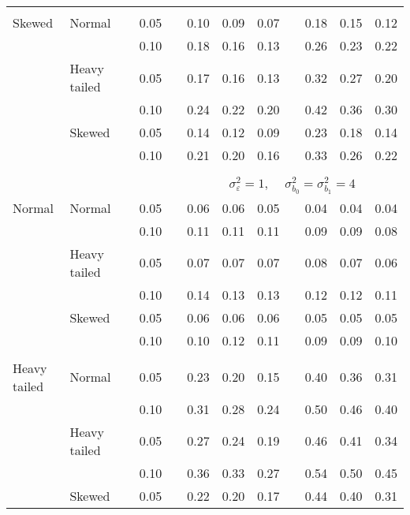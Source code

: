 \begin{table}[ht]
\begin{scriptsize}
\begin{center}
\begin{tabular}{ll p{.1cm} c p{.1cm} rrr p{.1cm} rrr}
             &&&&&&&&&&&\\
Skewed       & Normal       && 0.05 &&  0.10 & 0.09 & 0.07 && 0.18 & 0.15 & 0.12 \\ 
             &              && 0.10 &&  0.18 & 0.16 & 0.13 && 0.26 & 0.23 & 0.22 \\ 
             & Heavy tailed && 0.05 &&  0.17 & 0.16 & 0.13 && 0.32 & 0.27 & 0.20 \\ 
             &              && 0.10 &&  0.24 & 0.22 & 0.20 && 0.42 & 0.36 & 0.30 \\ 
             & Skewed       && 0.05 &&  0.14 & 0.12 & 0.09 && 0.23 & 0.18 & 0.14 \\ 
             &              && 0.10 &&  0.21 & 0.20 & 0.16 && 0.33 & 0.26 & 0.22 \\ 


&&&&&&&&&&&\\
& && && \multicolumn{7}{c}{$\sigma_{\varepsilon}^2 = 1$, \ \ $\sigma_{b_0}^2 = \sigma_{b_1}^2 = 4$} \\ \cline{6-12}
\rowcolor{gray!20}Normal       & Normal       && 0.05 &&  0.06 & 0.06 & 0.05 && 0.04 & 0.04 & 0.04 \\ 
\rowcolor{gray!20}             &              && 0.10 &&  0.11 & 0.11 & 0.11 && 0.09 & 0.09 & 0.08 \\ 
\rowcolor{gray!20}             & Heavy tailed && 0.05 &&  0.07 & 0.07 & 0.07 && 0.08 & 0.07 & 0.06 \\ 
\rowcolor{gray!20}             &              && 0.10 &&  0.14 & 0.13 & 0.13 && 0.12 & 0.12 & 0.11 \\ 
\rowcolor{gray!20}             & Skewed       && 0.05 &&  0.06 & 0.06 & 0.06 && 0.05 & 0.05 & 0.05 \\ 
\rowcolor{gray!20}             &              && 0.10 &&  0.10 & 0.12 & 0.11 && 0.09 & 0.09 & 0.10 \\ 
             &&&&&&&&&&&\\
Heavy tailed & Normal       && 0.05 &&  0.23 & 0.20 & 0.15 && 0.40 & 0.36 & 0.31 \\ 
             &              && 0.10 &&  0.31 & 0.28 & 0.24 && 0.50 & 0.46 & 0.40 \\ 
             & Heavy tailed && 0.05 &&  0.27 & 0.24 & 0.19 && 0.46 & 0.41 & 0.34 \\ 
             &              && 0.10 &&  0.36 & 0.33 & 0.27 && 0.54 & 0.50 & 0.45 \\ 
             & Skewed       && 0.05 &&  0.22 & 0.20 & 0.17 && 0.44 & 0.40 & 0.31 \\ 

\end{tabular}
\end{center}
\end{scriptsize}
\end{table}
